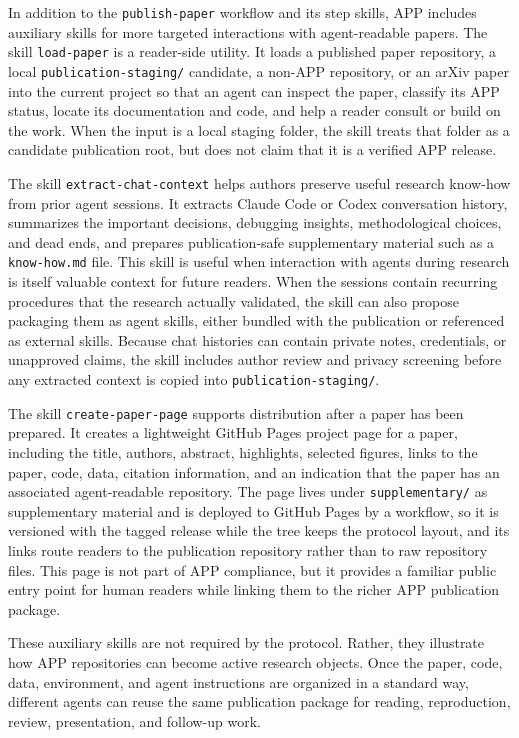 \documentclass{article}
\begin{document}
In addition to the \texttt{publish-paper} workflow and its step skills, APP
includes auxiliary skills for more targeted interactions with agent-readable
papers. The skill \texttt{load-paper} is a reader-side utility. It loads a
published paper repository, a local \texttt{publication-staging/} candidate, a
non-APP repository, or an arXiv paper into the current project so that an agent
can inspect the paper, classify its APP status, locate its documentation and
code, and help a reader consult or build on the work. When the input is a local
staging folder, the skill treats that folder as a candidate publication root, but
does not claim that it is a verified APP release.

The skill \texttt{extract-chat-context} helps authors preserve useful research
know-how from prior agent sessions. It extracts Claude Code or Codex
conversation history, summarizes the important decisions, debugging insights,
methodological choices, and dead ends, and prepares publication-safe
supplementary material such as a \texttt{know-how.md} file. This skill is useful
when interaction with agents during research is itself valuable context for future
readers. When the sessions contain recurring procedures that the research
actually validated, the skill can also propose packaging them as agent skills,
either bundled with the publication or referenced as external skills. Because chat histories can contain private notes, credentials, or
unapproved claims, the skill includes author review and privacy screening before
any extracted context is copied into \texttt{publication-staging/}.

The skill \texttt{create-paper-page} supports distribution after a paper has
been prepared. It creates a lightweight GitHub Pages project page for a paper,
including the title, authors, abstract, highlights, selected figures, links to
the paper, code, data, citation information, and an indication that the paper has
an associated agent-readable repository. The page lives under
\texttt{supplementary/} as supplementary material and is deployed to GitHub
Pages by a workflow, so it is versioned with the tagged release while the tree
keeps the protocol layout, and its links route readers to the publication
repository rather than to raw repository files. This page is not part of APP
compliance, but it provides a familiar public entry point for human readers while
linking them to the richer APP publication package.

These auxiliary skills are not required by the protocol. Rather, they illustrate
how APP repositories can become active research objects. Once the paper, code,
data, environment, and agent instructions are organized in a standard way,
different agents can reuse the same publication package for reading,
reproduction, review, presentation, and follow-up work.
\end{document}
